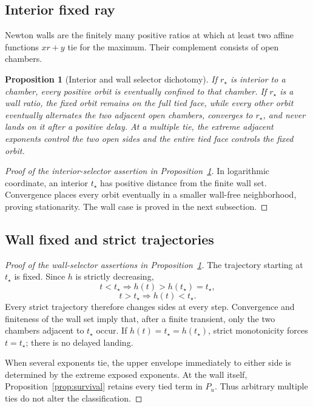 \documentclass[11pt]{article}
\newtheorem{proposition}[theorem]{Proposition}
\theoremstyle{definition}
\theoremstyle{remark}
\begin{document}
\subsection{Interior fixed ray}

Newton walls are the finitely many positive ratios at which at least two
affine functions \(xr+y\) tie for the maximum.  Their complement consists
of open chambers.

\begin{proposition}[Interior and wall selector dichotomy]
\label{prop:selectors}
If \(r_\star\) is interior to a chamber, every positive orbit is eventually
confined to that chamber.  If \(r_\star\) is a wall ratio, the fixed orbit
remains on the full tied face, while every other orbit eventually
alternates the two adjacent open chambers, converges to \(r_\star\), and
never lands on it after a positive delay.  At a multiple tie, the extreme
adjacent exponents control the two open sides and the entire tied face
controls the fixed orbit.
\end{proposition}

\begin{proof}[Proof of the interior-selector assertion in
Proposition~\ref{prop:selectors}]
In logarithmic coordinate, an interior \(t_\star\) has positive distance
from the finite wall set.  Convergence places every orbit eventually in a
smaller wall-free neighborhood, proving stationarity.  The wall case is
proved in the next subsection.
\end{proof}

\subsection{Wall fixed and strict trajectories}

\begin{proof}[Proof of the wall-selector assertions in
Proposition~\ref{prop:selectors}]
The trajectory starting at \(t_\star\) is fixed.  Since \(h\) is strictly
decreasing,
\[
t<t_\star\Longrightarrow h(t)>h(t_\star)=t_\star,
\]
\[
t>t_\star\Longrightarrow h(t)<t_\star.
\]
Every strict trajectory therefore changes sides at every step.
Convergence and finiteness of the wall set imply that, after a finite
transient, only the two chambers adjacent to \(t_\star\) occur.  If
\(h(t)=t_\star=h(t_\star)\), strict monotonicity forces \(t=t_\star\);
there is no delayed landing.

When several exponents tie, the upper envelope immediately to either side
is determined by the extreme exposed exponents.  At the wall itself,
Proposition~\ref{prop:survival} retains every tied term in \(P_u\).
Thus arbitrary multiple ties do not alter the classification.
\end{proof}
\end{document}
